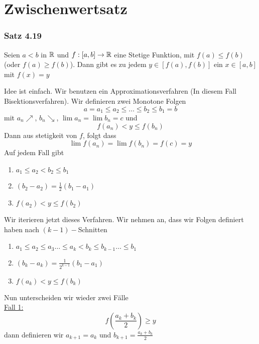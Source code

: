 \section{Zwischenwertsatz}
\subsubsection*{Satz 4.19}
Seien $a<b$ in $\mathbb{R}$ und $f:\lbrack a,b\rbrack\to\mathbb{R}$ eine Stetige Funktion, mit $f(a)\leq f\left( b\right)$ (oder $f(a)\geq f\left( b\right)$). Dann gibt es zu jedem $y\in\left[ f(a),f\left( b\right)\right]$ ein $x\in\left[ a,b\right]$ mit $f(x)=y$

\begin{beweis}{}
Idee ist einfach. Wir benutzen ein Approximationsverfahren (In diesem Fall Bisektionsverfahren). Wir definieren zwei Monotone Folgen
\[ a=a_1\leq a_2\leq\dots\leq b_2\leq b_1=b\]
mit $a_n\nearrow$, $b_n\searrow$, $\lim a_n=\lim b_n=c$ und 
\[ f\left( a_n\right)<y\leq f\left( b_n\right)\]
Dann aus stetigkeit von $f$, folgt dass 
\[ \lim f\left( a_n\right)=\lim f\left( b_n\right)=f(c)=y\]
Auf jedem Fall gibt
\begin{enumerate}
\item $a_1\leq a_2 < b_2 \leq b_1$
\item $\left( b_2-a_2\right)=\frac{1}{2}\left( b_1-a_1\right)$
\item $f\left( a_2\right) < y \leq f\left( b_2\right)$
\end{enumerate}
Wir iterieren jetzt dieses Verfahren. Wir nehmen an, dass wir Folgen definiert haben nach $(k-1)-$Schnitten 
\begin{enumerate}
\item $a_1\leq a_2\leq a_3\dots\leq a_k < b_k\leq b_{k-1}\dots\leq b_1$
\item $\left( {{b_k} - {a_k}} \right) = \frac{1}{{{2^{k - 1}}}}\left( {{b_1} - {a_1}} \right)$
\item $f\left( a_k\right) < y \leq f\left( b_k\right)$
\end{enumerate}
Nun unterscheiden wir wieder zwei Fälle\\

\noindent\underline{Fall 1:}
\[f\left( {\frac{{{a_k} + {b_k}}}{2}} \right) \ge y\] dann definieren wir $a_{k+1}=a_k$ und $b_{k+1}=\frac{a_k+b_k}{2}$\\


\end{beweis}
